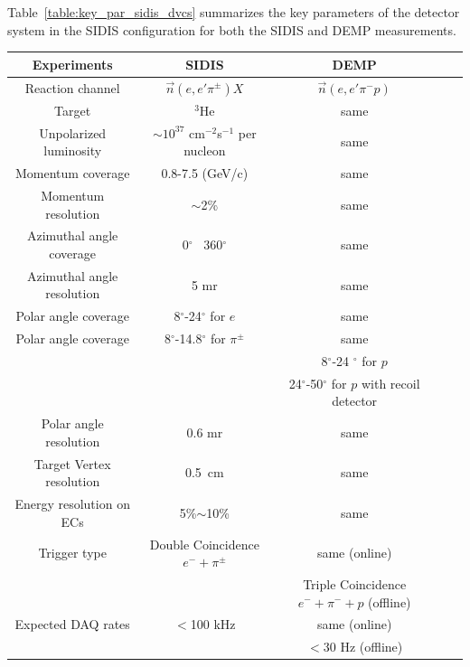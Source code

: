 Table~\ref{table:key_par_sidis_dvcs} summarizes the key parameters of the
detector system in the SIDIS configuration for both the SIDIS and DEMP
measurements.
\begin{table}\centering
\begin{tabular}{|c|c|c|c|c|}
\hline
Experiments                & SIDIS                    & DEMP  \\\hline
Reaction channel           & $\vec{n}(e,e'\pi^{\pm})X$ & $\vec{n}(e,e'\pi^{-}p)$	\\\hline
Target                     & $^3$He                   &same 	\\\hline
Unpolarized luminosity     & $\sim10^{37}$ cm$^{-2}$s$^{-1}$ per nucleon & same	\\\hline 
Momentum coverage          & 0.8-7.5 (GeV/c)          &same 	\\\hline
Momentum resolution        & $\sim$2\%                & same\\\hline
Azimuthal angle coverage   & 0$^{\circ}$ ~360$^{\circ}$ & same	\\\hline
Azimuthal angle resolution & 5 mr                     & same	\\\hline
Polar angle coverage       & 8$^{\circ}$-24$^{\circ}$ for $e$ &  same \\\hline
Polar angle coverage       & 8$^{\circ}$-14.8$^{\circ}$ for $\pi^{\pm}$  &  same 	\\\hline
                           &                          & 8$^{\circ}$-24 $^{\circ}$ for $p$ \\\hline
                           &                          & 24$^{\circ}$-50$^{\circ}$ for $p$ with recoil detector         \\\hline
Polar angle resolution     & 0.6 mr                   & same	\\\hline
Target Vertex resolution   & 0.5~cm                   & same \\\hline
 Energy resolution on ECs  & 5\%$\sim$10\%            & same   \\\hline
Trigger type               & Double Coincidence $e^-+\pi^{\pm}$ & same (online)\\\hline
              &  & Triple Coincidence $e^-+\pi^{-}+p$ (offline)\\\hline

Expected DAQ rates         &  $<$100 kHz              &  same (online)\\\hline
          &              &  $<$30 Hz (offline)\\\hline


\end{tabular}
\end{table}
